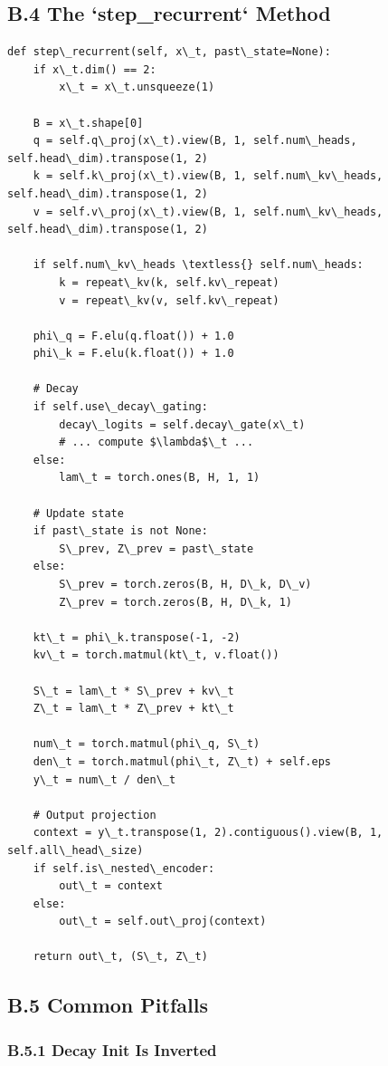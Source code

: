 \subsection{B.4 The `step\_recurrent` Method}

\begin{lstlisting}
def step\_recurrent(self, x\_t, past\_state=None):
    if x\_t.dim() == 2:
        x\_t = x\_t.unsqueeze(1)
    
    B = x\_t.shape[0]
    q = self.q\_proj(x\_t).view(B, 1, self.num\_heads, self.head\_dim).transpose(1, 2)
    k = self.k\_proj(x\_t).view(B, 1, self.num\_kv\_heads, self.head\_dim).transpose(1, 2)
    v = self.v\_proj(x\_t).view(B, 1, self.num\_kv\_heads, self.head\_dim).transpose(1, 2)
    
    if self.num\_kv\_heads \textless{} self.num\_heads:
        k = repeat\_kv(k, self.kv\_repeat)
        v = repeat\_kv(v, self.kv\_repeat)
    
    phi\_q = F.elu(q.float()) + 1.0
    phi\_k = F.elu(k.float()) + 1.0
    
    # Decay
    if self.use\_decay\_gating:
        decay\_logits = self.decay\_gate(x\_t)
        # ... compute $\lambda$\_t ...
    else:
        lam\_t = torch.ones(B, H, 1, 1)
    
    # Update state
    if past\_state is not None:
        S\_prev, Z\_prev = past\_state
    else:
        S\_prev = torch.zeros(B, H, D\_k, D\_v)
        Z\_prev = torch.zeros(B, H, D\_k, 1)
    
    kt\_t = phi\_k.transpose(-1, -2)
    kv\_t = torch.matmul(kt\_t, v.float())
    
    S\_t = lam\_t * S\_prev + kv\_t
    Z\_t = lam\_t * Z\_prev + kt\_t
    
    num\_t = torch.matmul(phi\_q, S\_t)
    den\_t = torch.matmul(phi\_t, Z\_t) + self.eps
    y\_t = num\_t / den\_t
    
    # Output projection
    context = y\_t.transpose(1, 2).contiguous().view(B, 1, self.all\_head\_size)
    if self.is\_nested\_encoder:
        out\_t = context
    else:
        out\_t = self.out\_proj(context)
    
    return out\_t, (S\_t, Z\_t)
\end{lstlisting}

\subsection{B.5 Common Pitfalls}

\subsubsection{B.5.1 Decay Init Is Inverted}

